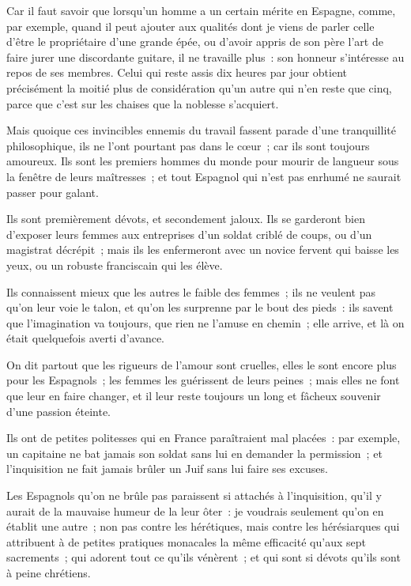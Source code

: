\documentclass[french,twoside]{book} %
\begin{document}
Car il faut savoir que lorsqu’un homme a un certain mérite en Espagne, comme, par exemple, quand il peut ajouter aux qualités dont je viens de parler celle d’être le propriétaire d’une grande épée, ou d’avoir appris de son père l’art de faire jurer une discordante guitare, il ne travaille plus : son honneur s’intéresse au repos de ses membres. Celui qui reste assis dix heures par jour obtient précisément la moitié plus de considération qu’un autre qui n’en reste que cinq, parce que c’est sur les chaises que la noblesse s’acquiert.\par
Mais quoique ces invincibles ennemis du travail fassent parade d’une tranquillité philosophique, ils ne l’ont pourtant pas dans le cœur ; car ils sont toujours amoureux. Ils sont les premiers hommes du monde pour mourir de langueur sous la fenêtre de leurs maîtresses ; et tout Espagnol qui n’est pas enrhumé ne saurait passer pour galant.\par
Ils sont premièrement dévots, et secondement jaloux. Ils se garderont bien d’exposer leurs femmes aux entreprises d’un soldat criblé de coups, ou d’un magistrat décrépit ; mais ils les enfermeront avec un novice fervent qui baisse les yeux, ou un robuste franciscain qui les élève.\par
Ils connaissent mieux que les autres le faible des femmes ; ils ne veulent pas qu’on leur voie le talon, et qu’on les surprenne par le bout des pieds : ils savent que l’imagination va toujours, que rien ne l’amuse en chemin ; elle arrive, et là on était quelquefois averti d’avance.\par
On dit partout que les rigueurs de l’amour sont cruelles, elles le sont encore plus pour les Espagnols ; les femmes les guérissent de leurs peines ; mais elles ne font que leur en faire changer, et il leur reste toujours un long et fâcheux souvenir d’une passion éteinte.\par
Ils ont de petites politesses qui en France paraîtraient mal placées : par exemple, un capitaine ne bat jamais son soldat sans lui en demander la permission ; et l’inquisition ne fait jamais brûler un Juif sans lui faire ses excuses.\par
Les Espagnols qu’on ne brûle pas paraissent si attachés à l’inquisition, qu’il y aurait de la mauvaise humeur de la leur ôter : je voudrais seulement qu’on en établit une autre ; non pas contre les hérétiques, mais contre les hérésiarques qui attribuent à de petites pratiques monacales la même efficacité qu’aux sept sacrements ; qui adorent tout ce qu’ils vénèrent ; et qui sont si dévots qu’ils sont à peine chrétiens.\par
\end{document}
